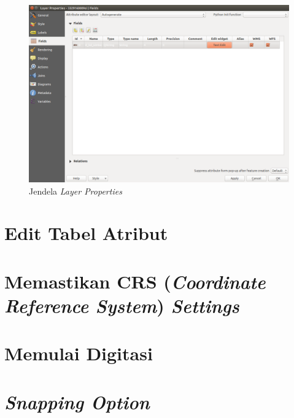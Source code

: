 \begin{enumerate}[1.]
  \begin{figure}[H]
    \centering
    \includegraphics[width=1\textwidth]{./resources/039-jendela-layer-properties}
    \caption{Jendela \textit{Layer Properties}}
    \label{fig:layerpropertieswin}
  \end{figure}
  
\end{enumerate}

\section{Edit Tabel Atribut}

\section{Memastikan CRS (\textit{Coordinate Reference System}) \textit{Settings}}

\section{Memulai Digitasi}

\section{\textit{Snapping Option}}